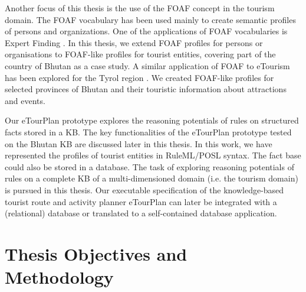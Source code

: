 \hspace{0.3in}Another focus of this thesis is the use of the FOAF \cite{DB:05} concept in the tourism domain. The FOAF vocabulary has been used  mainly to create semantic profiles of persons and organizations. One of the applications of FOAF vocabularies is Expert Finding \cite{JieL:06}. In this thesis, we extend FOAF profiles for persons or organisations to FOAF-like profiles for tourist entities, covering part of the country of Bhutan as a case study. A similar application of FOAF to eTourism has been explored for the Tyrol region \cite{deri:04}. We created FOAF-like profiles for selected provinces of Bhutan and their touristic information about attractions and events.

\hspace{0.3in}Our eTourPlan prototype explores the reasoning potentials of rules on structured facts stored in a KB. The key functionalities of the eTourPlan prototype tested on the Bhutan KB are discussed later in this thesis. In this work, we have represented the profiles of tourist entities in RuleML/POSL syntax. The fact base could also be stored in a database. The task of exploring reasoning potentials of rules on a complete KB of a multi-dimensioned domain (i.e. the tourism domain) is pursued in this thesis. Our executable specification of the knowledge-based tourist route and activity planner eTourPlan can later be integrated with a (relational) database or translated to a self-contained database application. 
 
\doublespacing
\section{Thesis Objectives and Methodology}

